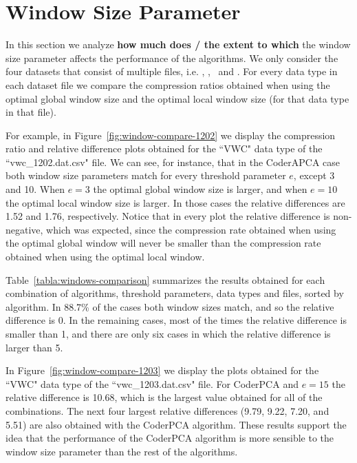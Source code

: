 
\clearpage
\section{Window Size Parameter}
\label{secX:windows}

In this section we analyze \textbf{how much does / the extent to which} the window size parameter affects the performance of the algorithms. We only consider the four datasets that consist of multiple files, i.e. \datasetirkis, \datasetsst, \datasetadcp \ and \datasetsolar. For every data type in each dataset file we compare the compression ratios obtained when using the optimal global window size and the optimal local window size (for that data type in that file). 

For example, in Figure~\ref{fig:window-compare-1202} we display the compression ratio and relative difference plots obtained for the ``VWC" data type of the ``vwc\_1202.dat.csv" file. We can see, for instance, that in the CoderAPCA case both window size parameters match for every threshold parameter $e$, except 3 and 10. When $e=3$ the optimal global window size is larger, and when $e=10$ the optimal local window size is larger. In those cases the relative differences are 1.52 and 1.76, respectively. Notice that in every plot the relative difference is non-negative, which was expected, since the compression rate obtained when using the optimal global window will never be smaller than the compression rate obtained when using the optimal local window.

Table~\ref{tabla:windows-comparison} summarizes the results obtained for each combination of algorithms, threshold parameters, data types and files, sorted by algorithm. In 88.7\% of the cases both window sizes match, and so the relative difference is 0. In the remaining cases, most of the times the relative difference is smaller than 1, and there are only six cases in which the relative difference is larger than 5.

\vspace{+10pt}

\vspace{-5pt}

In Figure~\ref{fig:window-compare-1203} we display the plots obtained for the ``VWC" data type of the ``vwc\_1203.dat.csv" file. For CoderPCA and $e=15$ the relative difference is 10.68, which is the largest value obtained for all of the combinations. The next four largest relative differences (9.79, 9.22, 7.20, and 5.51) are also obtained with the CoderPCA algorithm. These results support the idea that the performance of the CoderPCA algorithm is more sensible to the window size parameter than the rest of the algorithms.

